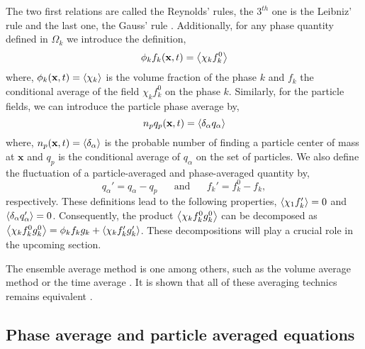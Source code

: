 The two first relations are called the Reynolds' rules, the $3^{th}$ one is the Leibniz' 
rule and the last one, the Gauss' rule \citep{drew1983mathematical}.
Additionally, for any phase quantity defined in $\Omega_k$ we introduce the definition, 
\begin{equation}
    \phi_k f_k (\textbf{x},t) = \left<\chi_k f_k^0\right>
    \label{eq:1_avg}
\end{equation}
where, $\phi_k(\textbf{x},t) = \left<\chi_k\right>$ is the volume fraction of the phase $k$
and $f_k$ the conditional average of the field $\chi_k f_k^0$ on the phase $k$.
Similarly, for the particle fields, we can introduce the particle phase average by,
\begin{equation}
     n_p q_p(\textbf{x},t) = \left<\delta_\alpha q_\alpha\right>
     \label{eq:p_avg}
\end{equation}
where, $n_p(\textbf{x},t) = \left<\delta_\alpha\right>$ is the probable number of finding a particle center of mass at $\textbf{x}$
and $q_p$ is the conditional average of $q_\alpha$ on the set of particles. 
We also define the fluctuation of a particle-averaged and phase-averaged quantity by,
\begin{equation}
    q_\alpha' = q_\alpha - q_p
    \;\;\;\;\;\;\text{and}
    \;\;\;\;\;\;
    f_k' = f_k^0 - f_k,
    \label{eq:def_fluctu}
\end{equation}
respectively. 
These definitions lead to the following properties, $\left<\chi_1 f'_k\right> = 0$ and $\left<\delta_\alpha q_\alpha'\right> =0$. 
Consequently, the product $\left<\chi_k f^0_kg^0_k\right>$ can be decomposed as $\left<\chi_k f_k^0g_k^0\right>=\phi_k f_kg_k + \left<\chi_k f'_kg'_k\right>$. 
These decompositions will play a crucial role in the upcoming section. 

The ensemble average method is one among others, such as the volume average method\citep{jackson1997locally} or the time average
\citep{ishii2010thermo}.
It is shown that all of these averaging technics remains equivalent \citep{jackson1997locally}. 

\subsection{Phase average and particle averaged equations}

